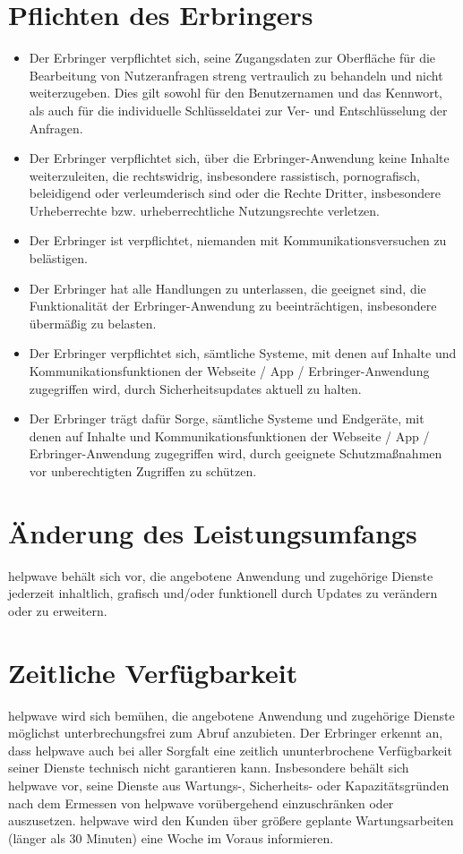 \documentclass[10pt]{article}
\begin{document}
\section{Pflichten des Erbringers}
\begin{itemize}
	\item Der Erbringer verpflichtet sich, seine Zugangsdaten zur Oberfläche für die Bearbeitung von Nutzeranfragen streng vertraulich zu behandeln und nicht weiterzugeben. Dies gilt sowohl für den Benutzernamen und das Kennwort, als auch für die
	      individuelle Schlüsseldatei zur Ver- und Entschlüsselung der Anfragen.
	\item Der Erbringer verpflichtet sich, über die Erbringer-Anwendung keine Inhalte weiterzuleiten, die rechtswidrig, insbesondere
	      rassistisch, pornografisch, beleidigend oder verleumderisch sind oder die Rechte Dritter, insbesondere Urheberrechte bzw.
	      urheberrechtliche Nutzungsrechte verletzen.
	\item Der Erbringer ist verpflichtet, niemanden mit Kommunikationsversuchen zu belästigen.
	\item Der Erbringer hat alle Handlungen zu unterlassen, die geeignet sind, die Funktionalität der Erbringer-Anwendung zu beeinträchtigen, insbesondere übermäßig zu belasten.
	\item Der Erbringer verpflichtet sich, sämtliche Systeme, mit denen auf Inhalte und Kommunikationsfunktionen der Webseite /
	      App / Erbringer-Anwendung zugegriffen wird, durch Sicherheitsupdates aktuell zu halten.
	\item Der Erbringer trägt dafür Sorge, sämtliche Systeme und Endgeräte, mit denen auf Inhalte und Kommunikationsfunktionen der Webseite / App / Erbringer-Anwendung zugegriffen wird, durch geeignete Schutzmaßnahmen vor unberechtigten
	      Zugriffen zu schützen.
\end{itemize}

\section{Änderung des Leistungsumfangs}
helpwave behält sich vor, die angebotene Anwendung und zugehörige Dienste jederzeit inhaltlich, grafisch und/oder funktionell durch Updates zu verändern oder zu erweitern.

\section{Zeitliche Verfügbarkeit}
helpwave wird sich bemühen, die angebotene Anwendung und zugehörige Dienste möglichst unterbrechungsfrei zum Abruf
anzubieten. Der Erbringer erkennt an, dass helpwave auch bei aller Sorgfalt eine zeitlich ununterbrochene Verfügbarkeit
seiner Dienste technisch nicht garantieren kann. Insbesondere behält sich helpwave vor, seine Dienste aus Wartungs-, Sicherheits- oder Kapazitätsgründen nach dem Ermessen von helpwave vorübergehend einzuschränken oder auszusetzen. helpwave wird den Kunden über größere geplante Wartungsarbeiten (länger als 30 Minuten) eine Woche im Voraus informieren.
\end{document}
